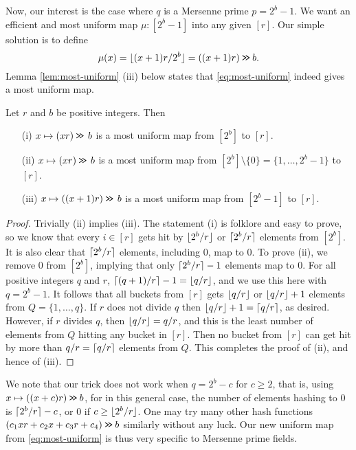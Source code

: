 Now, our interest is the case where $q$ is a Mersenne prime $p=2^b-1$. We want
an efficient and most uniform map $\mu:[2^b-1]$ into any given $[r]$.
Our simple solution is to define
\begin{equation}\label{eq:most-uniform}
	\mu(x)=\lfloor {(x+1)r/2^b} \rfloor=((x+1)r)\mathbin{\texttt{>\!>}} b.
\end{equation}
Lemma \ref{lem:most-uniform} (iii) below
states that \eqref{eq:most-uniform} indeed
gives a most uniform map.
\begin{lemma}\label{lem:most-uniform} Let $r$ and $b$ be positive integers.
	Then
	\begin{itemize}
		\item[(i)] $x\mapsto (xr)\mathbin{\texttt{>\!>}}\,b$ is a most
		      uniform map from $[2^b]$ to $[r]$.
		\item[(ii)] $x\mapsto (xr)\mathbin{\texttt{>\!>}}\,b$ is a most
		      uniform map from $[2^b]\setminus\{0\}=\{1,\ldots,2^b-1\}$ to $[r]$.
		\item[(iii)] $x\mapsto ((x+1)r)\mathbin{\texttt{>\!>}} \, b$ is a most
		      uniform map from $[2^b-1]$ to $[r]$.
	\end{itemize}
\end{lemma}
\begin{proof}
	Trivially (ii) implies (iii).
	The statement (i) is folklore and easy to prove, so we know that every
	$i\in[r]$ gets hit by $\lfloor {2^b/r} \rfloor$ or $\lceil {2^b/r}\rceil$ elements from
	$[2^b]$. It is also clear that $\lceil {2^b/r}\rceil$ elements, including $0$,
	map to $0$. To prove (ii), we remove $0$ from $[2^b]$,
	implying that only
	$\lceil {2^b/r}\rceil-1$ elements map to $0$. For all positive integers $q$
	and $r$, $\lceil {(q+1)/r}\rceil-1=\lfloor {q/r} \rfloor$, and we use this here with
	$q=2^b-1$. It follows that all buckets from $[r]$ gets $\lfloor {q/r} \rfloor$
	or $\lfloor {q/r} \rfloor+1$ elements from $Q=\{1,\ldots,q\}$. If $r$ does
	not divide $q$ then $\lfloor {q/r} \rfloor+1=\lceil {q/r}\rceil$, as desired. However,
	if $r$ divides $q$, then $\lfloor {q/r} \rfloor=q/r$, and this
	is the least number of elements from $Q$ hitting any bucket in $[r]$. Then
	no bucket from $[r]$ can get hit by more than $q/r=\lceil {q/r}\rceil$
	elements from $Q$. This completes the proof of (ii), and hence of (iii).
\end{proof}
We note that our trick does not work when $q=2^b-c$ for $c\geq 2$, that is,
using $x\mapsto ((x+c)r)\mathbin{\texttt{>\!>}}  b$, for in this general case,
the number of elements hashing to $0$ is $\lceil {2^b/r}\rceil-c$, or $0$ if
$c\geq \lfloor {2^b/r} \rfloor$.
One may try many other hash functions $(c_1 x r+ c_2 x+ c_3 r + c_4) \mathbin{\texttt{>\!>}} b$ similarly without any luck.
Our new uniform map from \eqref{eq:most-uniform} is thus very specific to Mersenne prime fields.

